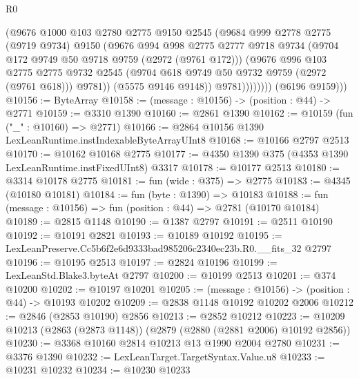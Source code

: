 \begin{lexlean}{R0}
\begin{coremodule}
                      (@9676
                        @1000
                        @103
                        @2780
                        @2775
                        @9150
                        @2545
                        (@9684
                          @999
                          @2778
                          @2775
                          (@9719 @9734)
                          @9150
                          (@9676
                            @994
                            @998
                            @2775
                            @2777
                            @9718
                            @9734
                            (@9704 @172 @9749 @50 @9718 @9759 (@2972 (@9761 @172)))
                            (@9676
                              @996
                              @103
                              @2775
                              @2775
                              @9732
                              @2545
                              (@9704 @618 @9749 @50 @9732 @9759 (@2972 (@9761 @618)))
                              @9781))
                          (@5575 @9146 @9148))
                        @9781))))))))
        (@6196 @9159)))
@10156 := ByteArray
@10158 := (message : @10156) -> (position : @44) -> @2771
@10159 := @3310 @1390
@10160 := @2861 @1390
@10162 := @10159 (fun ("_" : @10160) => @2771)
@10166 := @2864 @10156 @1390 LexLeanRuntime.instIndexableByteArrayUInt8
@10168 := @10166 @2797 @2513
@10170 := @10162 @10168 @2775
@10177 := @4350 @1390 @375 (@4353 @1390 LexLeanRuntime.instFixedUInt8) @3317
@10178 := @10177 @2513
@10180 := @3314 @10178 @2775
@10181 := fun (wide : @375) => @2775
@10183 := @4345 (@10180 @10181)
@10184 := fun (byte : @1390) => @10183
@10188 := fun (message : @10156) => fun (position : @44) => @2781 (@10170 @10184)
@10189 := @2815 @1148
@10190 := @1387 @2797
@10191 := @2511 @10190
@10192 := @10191 @2821
@10193 := @10189 @10192
@10195 := LexLeanPreserve.Cc5b6f2e6d9333bad985206c2340ec23b.R0.__fits_32 @2797
@10196 := @10195 @2513
@10197 := @2824 @10196
@10199 := LexLeanStd.Blake3.byteAt @2797
@10200 := @10199 @2513
@10201 := @374 @10200
@10202 := @10197 @10201
@10205 := (message : @10156) -> (position : @44) -> @10193 @10202
@10209 := @2838 @1148 @10192 @10202 @2006
@10212 := @2846 (@2853 @10190) @2856
@10213 := @2852 @10212
@10223 := @10209 @10213 (@2863 (@2873 @1148)) (@2879 (@2880 (@2881 @2006) @10192 @2856))
@10230 := @3368 @10160 @2814 @10213 @13 @1990 @2004 @2780
@10231 := @3376 @1390
@10232 := LexLeanTarget.TargetSyntax.Value.u8
@10233 := @10231 @10232
@10234 := @10230 @10233

\end{coremodule}
\end{lexlean}
